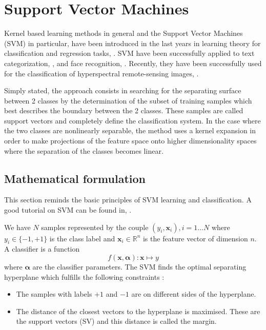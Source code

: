 \ifitkFullVersion 

\fi



\section{Support Vector Machines}
\label{sec:SupportVectorMachines}

Kernel based learning methods in general and the Support Vector
Machines (SVM) in particular, have been introduced in the last years
in learning theory for classification and regression tasks,
\cite{vapnik}. SVM have been successfully applied to text
categorization, \cite{joachims}, and face recognition,
\cite{osuna}. Recently, they have been successfully used for the
classification of hyperspectral remote-sensing images, \cite{bruzzoneSVM}.

Simply stated, the approach consists in searching for the separating
surface between 2 classes by the determination of the subset of
training samples which best describes the boundary between the 2
classes. These samples are called support vectors and completely
define the classification system. In the case where the two classes are
nonlinearly separable, the method uses a kernel expansion in order to make
projections of the feature space onto higher dimensionality spaces
where the separation of the classes becomes linear.

 \subsection{Mathematical formulation}

 This section reminds the basic principles of SVM learning and
 classification. A good tutorial on SVM can be found in, \cite{burges}.
 
We have $N$ samples represented by the couple $(y_i,\mathbf{x}_i),
i=1\ldots N$ where $y_i \in \{-1,+1\}$ is the class label and
$\mathbf{x}_i \in \mathbb{R}^n$ is the feature vector of dimension
$n$. A classifier is a function  $$f(\mathbf{x},\boldsymbol{\alpha}) :
\mathbf{x}\mapsto y$$ where $\boldsymbol{\alpha}$ are the classifier
parameters. The SVM finds the optimal separating hyperplane which
fulfills the following constraints :
    \begin{itemize}
      \item The samples with labels $+1$ and $-1$ are on different
      sides of the hyperplane.
      \item The distance of the closest vectors to the hyperplane is
      maximised. These are the support vectors (SV) and this distance is
      called the margin.
    \end{itemize}


